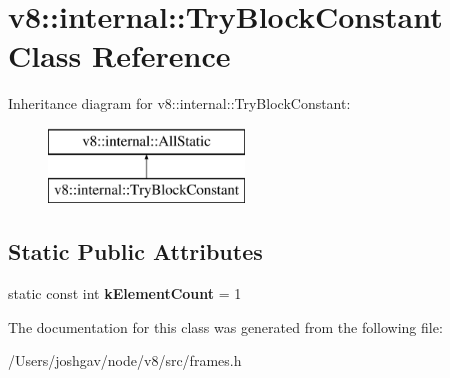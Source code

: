 \hypertarget{classv8_1_1internal_1_1_try_block_constant}{}\section{v8\+:\+:internal\+:\+:Try\+Block\+Constant Class Reference}
\label{classv8_1_1internal_1_1_try_block_constant}
Inheritance diagram for v8\+:\+:internal\+:\+:Try\+Block\+Constant\+:\begin{figure}[H]
\begin{center}
\leavevmode
\includegraphics[height=2.000000cm]{classv8_1_1internal_1_1_try_block_constant}
\end{center}
\end{figure}
\subsection*{Static Public Attributes}
\begin{DoxyCompactItemize}
\item 
static const int {\bfseries k\+Element\+Count} = 1\hypertarget{classv8_1_1internal_1_1_try_block_constant_acd20c58b08bee1c0ee2874c6f5567caf}{}\label{classv8_1_1internal_1_1_try_block_constant_acd20c58b08bee1c0ee2874c6f5567caf}

\end{DoxyCompactItemize}


The documentation for this class was generated from the following file\+:\begin{DoxyCompactItemize}
\item 
/\+Users/joshgav/node/v8/src/frames.\+h\end{DoxyCompactItemize}
